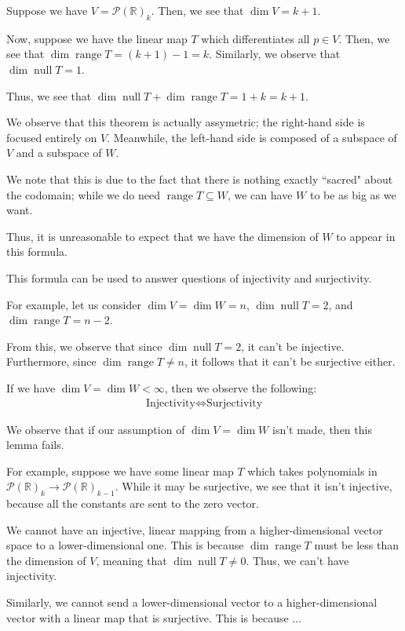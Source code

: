 \documentclass[openany]{book}
\newcommand{\RR}{\mathbb{R}}
\DeclareMathOperator*{\vnull}{null}
\DeclareMathOperator*{\vrange}{range}
\begin{document}
\begin{example}
	Suppose we have $V = \mathscr{P}(\RR)_{k}$. Then, we see that $\dim V = k+1$.
	
	Now, suppose we have the linear map $T$ which differentiates all $p \in V$. Then, we see that $\dim \vrange T = (k+1) - 1 = k$. Similarly, we observe that $\dim \vnull T = 1$.
	
	Thus, we see that $\dim \vnull T + \dim \vrange T = 1 + k = k + 1$.
\end{example}

\begin{rmk}
	We observe that this theorem is actually assymetric; the right-hand side is focused entirely on $V$. Meanwhile, the left-hand side is composed of a subspace of $V$ and a subspace of $W$.
	
	We note that this is due to the fact that there is nothing exactly ``sacred" about the codomain; while we do need $\vrange T \subseteq W$, we can have $W$ to be as big as we want.
	
	Thus, it is unreasonable to expect that we have the dimension of $W$ to appear in this formula.
\end{rmk}

\begin{example}
	This formula can be used to answer questions of injectivity and surjectivity.
	
	For example, let us consider $\dim V = \dim W = n$, $\dim \vnull T = 2$, and $\dim \vrange T = n - 2$.
	
	From this, we observe that since $\dim \vnull T = 2$, it can't be injective. Furthermore, since $\dim \vrange T \not= n$, it follows that it can't be surjective either.
\end{example}

\begin{lem}
	If we have $\dim V = \dim W < \infty$, then we observe the following:
	\begin{align*}
		\text{Injectivity} \iff \text{Surjectivity}
	\end{align*}
\end{lem}
\begin{rmk}
	We observe that if our assumption of $\dim V = \dim W$ isn't made, then this lemma fails.
	
	For example, suppose we have some linear map $T$ which takes polynomials in $\mathscr{P}(\RR)_{k} \rightarrow \mathscr{P}(\RR)_{k-1}$. While it may be surjective, we see that it isn't injective, because all the constants are sent to the zero vector.
\end{rmk}
\begin{lem}
	We cannot have an injective, linear mapping from a higher-dimensional vector space to a lower-dimensional one. This is because $\dim \vrange T$ must be less than the dimension of $V$, meaning that $\dim \vnull T \not= 0$. Thus, we can't have injectivity.
	
	Similarly, we cannot send a lower-dimensional vector to a higher-dimensional vector with a linear map that is surjective. This is because ...
\end{lem}
\end{document}
